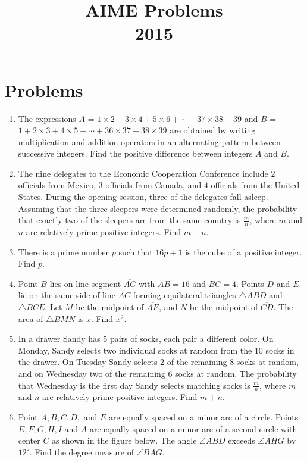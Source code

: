 \documentclass{article}
\title{AIME Problems \\ 2015}
\date{}
\begin{document}
\maketitle\thispagestyle{fancy}\newpage\section*{Problems}\begin{enumerate}[label=\arabic*., itemsep=0.5em]\item The expressions $A$ = $ 1 \times 2 + 3 \times 4 + 5 \times 6 + \cdots + 37 \times 38 + 39 $ and $B$ = $ 1 + 2 \times 3 + 4 \times 5 + \cdots + 36 \times 37 + 38 \times 39 $ are obtained by writing multiplication and addition operators in an alternating pattern between successive integers.  Find the positive difference between integers $A$ and $B$.\par \vspace{0.5em}\item The nine delegates to the Economic Cooperation Conference include $2$ officials from Mexico, $3$ officials from Canada, and $4$ officials from the United States. During the opening session, three of the delegates fall asleep. Assuming that the three sleepers were determined randomly, the probability that exactly two of the sleepers are from the same country is $\frac{m}{n}$, where $m$ and $n$ are relatively prime positive integers. Find $m+n$.\par \vspace{0.5em}\item There is a prime number $p$ such that $16p+1$ is the cube of a positive integer.  Find $p$.\par \vspace{0.5em}\item Point $B$ lies on line segment $\overline{AC}$ with $AB=16$ and $BC=4$. Points $D$ and $E$ lie on the same side of line $AC$ forming equilateral triangles $\triangle ABD$ and $\triangle BCE$. Let $M$ be the midpoint of $\overline{AE}$, and $N$ be the midpoint of $\overline{CD}$. The area of $\triangle BMN$ is $x$. Find $x^2$.\par \vspace{0.5em}\item In a drawer Sandy has $5$ pairs of socks, each pair a different color.  On Monday, Sandy selects two individual socks at random from the $10$ socks in the drawer.  On Tuesday Sandy selects $2$ of the remaining $8$ socks at random, and on Wednesday two of the remaining $6$ socks at random.  The probability that Wednesday is the first day Sandy selects matching socks is $\frac{m}{n}$, where $m$ and $n$ are relatively prime positive integers. Find $m+n$.\par \vspace{0.5em}\item Point $A,B,C,D,$ and $E$ are equally spaced on a minor arc of a circle. Points $E,F,G,H,I$ and $A$ are equally spaced on a minor arc of a second circle with center $C$ as shown in the figure below. The angle $\angle ABD$ exceeds $\angle AHG$ by $12^\circ$. Find the degree measure of $\angle BAG$.



\end{enumerate}
\end{document}
